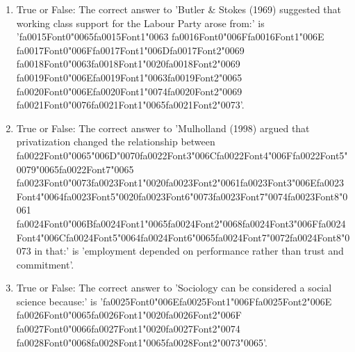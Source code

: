\documentclass[12pt]{article}
\begin{document}
\begin{enumerate}[label=\arabic*.]
\item True or False: The correct answer to 'Butler \& Stokes (1969) suggested that working class support for the Labour Party arose from:' is '{\csname fa0015Font0\endcsname\char"0065}{\csname fa0015Font1\endcsname\char"0063} {\csname fa0016Font0\endcsname\char"006F}{\csname fa0016Font1\endcsname\char"006E} {\csname fa0017Font0\endcsname\char"006F}{\csname fa0017Font1\endcsname\char"006D}{\csname fa0017Font2\endcsname\char"0069} {\csname fa0018Font0\endcsname\char"0063}{\csname fa0018Font1\endcsname\char"0020}{\csname fa0018Font2\endcsname\char"0069} {\csname fa0019Font0\endcsname\char"006E}{\csname fa0019Font1\endcsname\char"0063}{\csname fa0019Font2\endcsname\char"0065} {\csname fa0020Font0\endcsname\char"006E}{\csname fa0020Font1\endcsname\char"0074}{\csname fa0020Font2\endcsname\char"0069} {\csname fa0021Font0\endcsname\char"0076}{\csname fa0021Font1\endcsname\char"0065}{\csname fa0021Font2\endcsname\char"0073}'.
\item True or False: The correct answer to 'Mulholland (1998) argued that privatization changed the relationship between {\csname fa0022Font0\endcsname\char"0065}{\char"006D}{\char"0070}{\csname fa0022Font3\endcsname\char"006C}{\csname fa0022Font4\endcsname\char"006F}{\csname fa0022Font5\endcsname\char"0079}{\char"0065}{\csname fa0022Font7\endcsname\char"0065} {\csname fa0023Font0\endcsname\char"0073}{\csname fa0023Font1\endcsname\char"0020}{\csname fa0023Font2\endcsname\char"0061}{\csname fa0023Font3\endcsname\char"006E}{\csname fa0023Font4\endcsname\char"0064}{\csname fa0023Font5\endcsname\char"0020}{\csname fa0023Font6\endcsname\char"0073}{\csname fa0023Font7\endcsname\char"0074}{\csname fa0023Font8\endcsname\char"0061} {\csname fa0024Font0\endcsname\char"006B}{\csname fa0024Font1\endcsname\char"0065}{\csname fa0024Font2\endcsname\char"0068}{\csname fa0024Font3\endcsname\char"006F}{\csname fa0024Font4\endcsname\char"006C}{\csname fa0024Font5\endcsname\char"0064}{\csname fa0024Font6\endcsname\char"0065}{\csname fa0024Font7\endcsname\char"0072}{\csname fa0024Font8\endcsname\char"0073} in that:' is 'employment depended on performance rather than trust and commitment'.
\item True or False: The correct answer to 'Sociology can be considered a social science because:' is '{\csname fa0025Font0\endcsname\char"006E}{\csname fa0025Font1\endcsname\char"006F}{\csname fa0025Font2\endcsname\char"006E} {\csname fa0026Font0\endcsname\char"0065}{\csname fa0026Font1\endcsname\char"0020}{\csname fa0026Font2\endcsname\char"006F} {\csname fa0027Font0\endcsname\char"0066}{\csname fa0027Font1\endcsname\char"0020}{\csname fa0027Font2\endcsname\char"0074} {\csname fa0028Font0\endcsname\char"0068}{\csname fa0028Font1\endcsname\char"0065}{\csname fa0028Font2\endcsname\char"0073}{\char"0065}'.

\end{enumerate}
\end{document}
